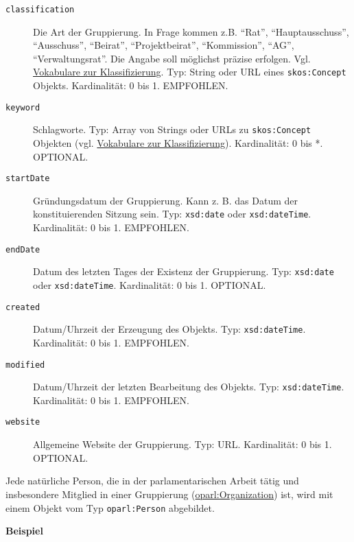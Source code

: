 \documentclass[,a4paper]{article}
\begin{document}
\begin{description}
\item[\texttt{classification}]
Die Art der Gruppierung. In Frage kommen z.B. ``Rat'',
``Hauptausschuss'', ``Ausschuss'', ``Beirat'', ``Projektbeirat'',
``Kommission'', ``AG'', ``Verwaltungsrat''. Die Angabe soll möglichst
präzise erfolgen. Vgl.
\hyperref[vokabulareux5fklassifizierung]{Vokabulare zur
Klassifizierung}. Typ: String oder URL eines \texttt{skos:Concept}
Objekts. Kardinalität: 0 bis 1. EMPFOHLEN.
\item[\texttt{keyword}]
Schlagworte. Typ: Array von Strings oder URLs zu \texttt{skos:Concept}
Objekten (vgl. \hyperref[vokabulareux5fklassifizierung]{Vokabulare zur
Klassifizierung}). Kardinalität: 0 bis *. OPTIONAL.
\item[\texttt{startDate}]
Gründungsdatum der Gruppierung. Kann z. B. das Datum der
konstituierenden Sitzung sein. Typ: \texttt{xsd:date} oder
\texttt{xsd:dateTime}. Kardinalität: 0 bis 1. EMPFOHLEN.
\item[\texttt{endDate}]
Datum des letzten Tages der Existenz der Gruppierung. Typ:
\texttt{xsd:date} oder \texttt{xsd:dateTime}. Kardinalität: 0 bis 1.
OPTIONAL.
\item[\texttt{created}]
Datum/Uhrzeit der Erzeugung des Objekts. Typ: \texttt{xsd:dateTime}.
Kardinalität: 0 bis 1. EMPFOHLEN.
\item[\texttt{modified}]
Datum/Uhrzeit der letzten Bearbeitung des Objekts. Typ:
\texttt{xsd:dateTime}. Kardinalität: 0 bis 1. EMPFOHLEN.
\item[\texttt{website}]
Allgemeine Website der Gruppierung. Typ: URL. Kardinalität: 0 bis 1.
OPTIONAL.
\end{description}


Jede natürliche Person, die in der parlamentarischen Arbeit tätig und
insbesondere Mitglied in einer Gruppierung
(\hyperref[oparlux5forganization]{oparl:Organization}) ist, wird mit
einem Objekt vom Typ \texttt{oparl:Person} abgebildet.

\textbf{Beispiel}
\end{document}

